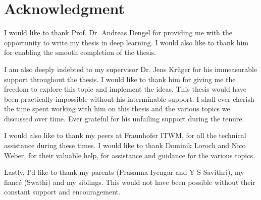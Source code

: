 
\clearpage
{}
\section*{Acknowledgment}

\begin{center}
\begin{minipage}[t]{1.0\textwidth}
I would like to thank Prof. Dr. Andreas Dengel for providing me with the opportunity to write my thesis in deep learning. I would also like to thank him for enabling the smooth completion of the thesis.

I am also deeply indebted to my supervisor Dr. Jens Krüger for his immeasurable support throughout the thesis. I would like to thank him for giving me the freedom to explore this topic and implement the ideas. This thesis would have been practically impossible without his interminable support. I shall ever cherish the time spent working with him on this thesis and the various topics we discussed over time. Ever grateful for his unfailing support during the tenure.

I would also like to thank my peers at Fraunhofer ITWM, for all the technical assistance during these times. I would like to thank Dominik Loroch and Nico Weber, for their valuable help, for assistance and guidance for the various topics. 

Lastly, I’d like to thank my parents (Prasanna Iyengar and Y S Savithri), my fiancé (Swathi) and my siblings. This would not have been possible without their constant support and encouragement.

\end{minipage}
\end{center}

\vfill



\vfill

\thispagestyle{empty}